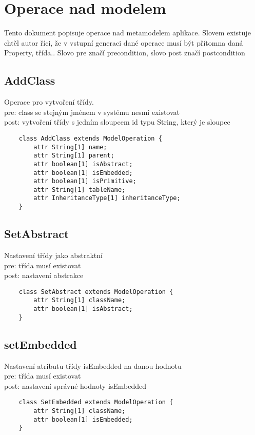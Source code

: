 \documentclass[11pt,a4paper]{article}
\begin{document}
\section{Operace nad modelem}

Tento dokument popisuje operace nad metamodelem aplikace. Slovem existuje
chtěl autor říci, že v vstupní generaci dané operace musí být přítomna daná
Property, třída.. Slovo pre značí precondition, slovo post značí postcondition

	\subsection{AddClass}
	Operace pro vytvoření třídy. \\
	pre: class se stejným jménem v systému nesmí existovat \\
	post: vytvoření třídy s jedním sloupcem id typu String, který je sloupec\\
	\begin{verbatim}
    class AddClass extends ModelOperation {
        attr String[1] name;
        attr String[1] parent;
        attr boolean[1] isAbstract;
        attr boolean[1] isEmbedded;
        attr boolean[1] isPrimitive;
        attr String[1] tableName;
        attr InheritanceType[1] inheritanceType;
    }	
	\end{verbatim}
	\subsection{SetAbstract}
	Nastavení třídy jako abstraktní \\
	pre: třída musí existovat\\
	post: nastavení abstrakce \\
	\begin{verbatim}
	class SetAbstract extends ModelOperation {
        attr String[1] className;
        attr boolean[1] isAbstract;
    }
	\end{verbatim}
	
	\subsection{setEmbedded}
	Nastavení atributu třídy isEmbedded na danou hodnotu\\
	pre: třída musí existovat\\ 
	post: nastavení správné hodnoty isEmbedded\\
	\begin{verbatim}
    class SetEmbedded extends ModelOperation {
        attr String[1] className;
        attr boolean[1] isEmbedded;
    }
	\end{verbatim}
	
\end{document}
